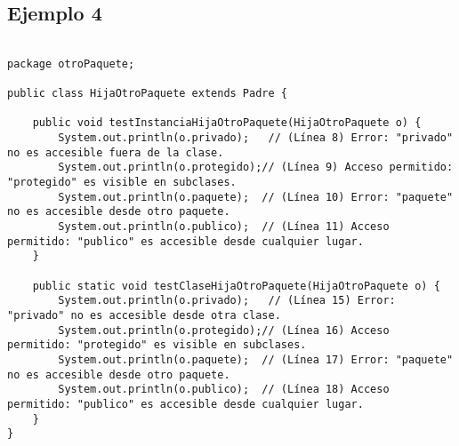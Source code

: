 \documentclass[a4paper,12pt]{article}
\begin{document}
\subsection{Ejemplo 4}
\begin{lstlisting}[style=customjava]

package otroPaquete;

public class HijaOtroPaquete extends Padre {

    public void testInstanciaHijaOtroPaquete(HijaOtroPaquete o) {
        System.out.println(o.privado);   // (Línea 8) Error: "privado" no es accesible fuera de la clase.
        System.out.println(o.protegido);// (Línea 9) Acceso permitido: "protegido" es visible en subclases.
        System.out.println(o.paquete);  // (Línea 10) Error: "paquete" no es accesible desde otro paquete.
        System.out.println(o.publico);  // (Línea 11) Acceso permitido: "publico" es accesible desde cualquier lugar.
    }

    public static void testClaseHijaOtroPaquete(HijaOtroPaquete o) {
        System.out.println(o.privado);   // (Línea 15) Error: "privado" no es accesible desde otra clase.
        System.out.println(o.protegido);// (Línea 16) Acceso permitido: "protegido" es visible en subclases.
        System.out.println(o.paquete);  // (Línea 17) Error: "paquete" no es accesible desde otro paquete.
        System.out.println(o.publico);  // (Línea 18) Acceso permitido: "publico" es accesible desde cualquier lugar.
    }
}
\end{lstlisting}
\end{document}
